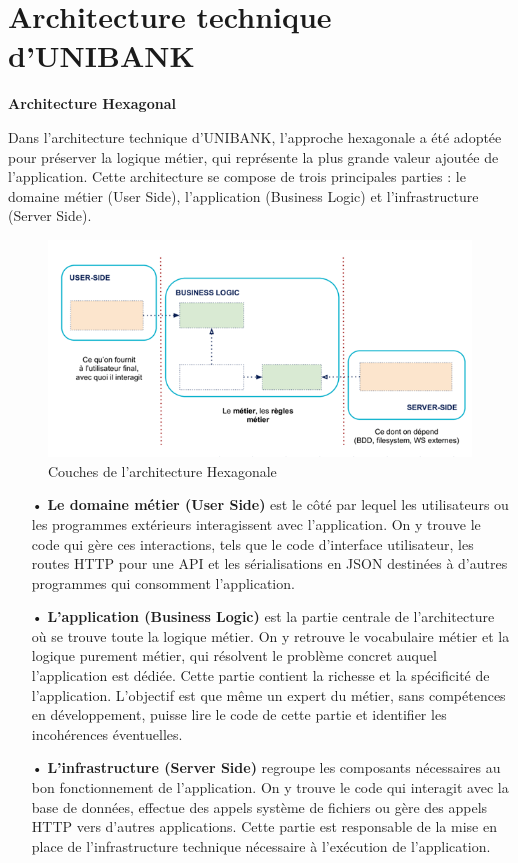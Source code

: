 \section{Architecture technique d'UNIBANK}
\textbf{\large{Architecture Hexagonal}\\}

Dans l'architecture technique d'UNIBANK, l'approche hexagonale a été adoptée pour préserver la logique métier, qui représente la plus grande valeur ajoutée de l'application. Cette architecture se compose de trois principales parties : le domaine métier (User Side), l'application (Business Logic) et l'infrastructure (Server Side).

\begin{figure}[!h]
    \centering %
        \includegraphics[width=16cm]{images/conception/hexagonal.png}
    \caption{Couches de l’architecture Hexagonale}
\end{figure}

\begin{itemize}
    \item[•] \textbf{Le domaine métier (User Side)} est le côté par lequel les utilisateurs ou les programmes extérieurs interagissent avec l'application. On y trouve le code qui gère ces interactions, tels que le code d'interface utilisateur, les routes HTTP pour une API et les sérialisations en JSON destinées à d'autres programmes qui consomment l'application.
    \item[•] \textbf{L'application (Business Logic)} est la partie centrale de l'architecture où se trouve toute la logique métier. On y retrouve le vocabulaire métier et la logique purement métier, qui résolvent le problème concret auquel l'application est dédiée. Cette partie contient la richesse et la spécificité de l'application. L'objectif est que même un expert du métier, sans compétences en développement, puisse lire le code de cette partie et identifier les incohérences éventuelles.
    \item[•] \textbf{L'infrastructure (Server Side)} regroupe les composants nécessaires au bon fonctionnement de l'application. On y trouve le code qui interagit avec la base de données, effectue des appels système de fichiers ou gère des appels HTTP vers d'autres applications. Cette partie est responsable de la mise en place de l'infrastructure technique nécessaire à l'exécution de l'application.
\end{itemize}

